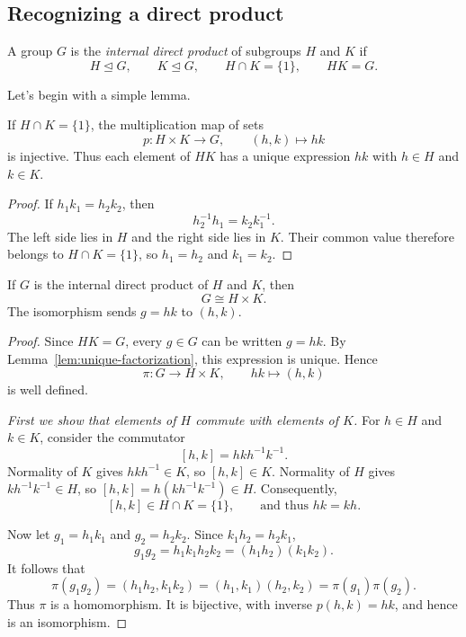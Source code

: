 \documentclass[reqno,11pt]{amsart}
\begin{document}
\subsection{Recognizing a direct product}

\begin{define}
A group $G$ is the \emph{internal direct product} of subgroups $H$ and
$K$ if
\[
  H\trianglelefteq G,\qquad K\trianglelefteq G,\qquad
  H\cap K=\{1\},\qquad HK=G.
\]
\end{define}

Let's begin with a simple lemma.


\begin{lemma}\label{lem:unique-factorization}
	If $H\cap K=\{1\}$, the multiplication map of sets
	\[
	p:H\times K\longrightarrow G,\qquad (h,k)\longmapsto hk
	\]
	is injective. Thus each element of $HK$ has a unique expression $hk$
	with $h\in H$ and $k\in K$.
\end{lemma}
\begin{proof}
	If $h_1k_1=h_2k_2$, then
	\[
	h_2^{-1}h_1=k_2k_1^{-1}.
	\]
	The left side lies in $H$ and the right side lies in $K$. Their common
	value therefore belongs to $H\cap K=\{1\}$, so $h_1=h_2$ and $k_1=k_2$.
\end{proof}


\begin{theorem}\label{thm:internal-product}
If $G$ is the internal direct product of $H$ and $K$, then
\[
  G\cong H\times K.
\]
The isomorphism sends $g=hk$ to $(h,k)$.
\end{theorem}
\begin{proof}
Since $HK=G$, every $g\in G$ can be written $g=hk$. By
Lemma~\ref{lem:unique-factorization}, this expression is unique. Hence
\[
  \pi:G\longrightarrow H\times K,\qquad hk\longmapsto(h,k)
\]
is well defined.

\emph{First we show that elements of $H$ commute with elements of $K$.}
For $h\in H$ and $k\in K$, consider the commutator
\[
  [h,k]=hkh^{-1}k^{-1}.
\]
Normality of $K$ gives $hkh^{-1}\in K$, so $[h,k]\in K$.
Normality of $H$ gives $kh^{-1}k^{-1}\in H$, so
$[h,k]=h(kh^{-1}k^{-1})\in H$. Consequently,
\[
  [h,k]\in H\cap K=\{1\},\qquad\text{and thus }hk=kh.
\]

Now let $g_1=h_1k_1$ and $g_2=h_2k_2$. Since $k_1h_2=h_2k_1$,
\[
  g_1g_2=h_1k_1h_2k_2=(h_1h_2)(k_1k_2).
\]
It follows that
\[
  \pi(g_1g_2)=(h_1h_2,k_1k_2)
  =(h_1,k_1)(h_2,k_2)=\pi(g_1)\pi(g_2).
\]
Thus $\pi$ is a homomorphism. It is bijective, with inverse
$p(h,k)=hk$, and hence is an isomorphism.
\end{proof}
\end{document}
